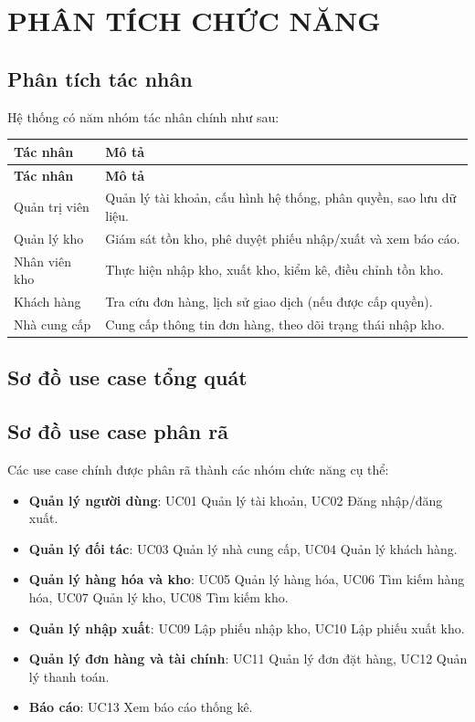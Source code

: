 \chapter{PHÂN TÍCH CHỨC NĂNG}

\section{Phân tích tác nhân}

Hệ thống có năm nhóm tác nhân chính như sau:

\begin{longtable}{|p{3.5cm}|p{9cm}|}
\hline
\textbf{Tác nhân} & \textbf{Mô tả} \\
\hline
\endfirsthead
\hline
\textbf{Tác nhân} & \textbf{Mô tả} \\
\hline
\endhead
Quản trị viên & Quản lý tài khoản, cấu hình hệ thống, phân quyền, sao lưu dữ liệu. \\
\hline
Quản lý kho & Giám sát tồn kho, phê duyệt phiếu nhập/xuất và xem báo cáo. \\
\hline
Nhân viên kho & Thực hiện nhập kho, xuất kho, kiểm kê, điều chỉnh tồn kho. \\
\hline
Khách hàng & Tra cứu đơn hàng, lịch sử giao dịch (nếu được cấp quyền). \\
\hline
Nhà cung cấp & Cung cấp thông tin đơn hàng, theo dõi trạng thái nhập kho. \\
\hline
\end{longtable}

\section{Sơ đồ use case tổng quát}



\section{Sơ đồ use case phân rã}

Các use case chính được phân rã thành các nhóm chức năng cụ thể:

\begin{itemize}[leftmargin=1.5cm]
    \item \textbf{Quản lý người dùng}: UC01 Quản lý tài khoản, UC02 Đăng nhập/đăng xuất.
    \item \textbf{Quản lý đối tác}: UC03 Quản lý nhà cung cấp, UC04 Quản lý khách hàng.
    \item \textbf{Quản lý hàng hóa và kho}: UC05 Quản lý hàng hóa, UC06 Tìm kiếm hàng hóa, UC07 Quản lý kho, UC08 Tìm kiếm kho.
    \item \textbf{Quản lý nhập xuất}: UC09 Lập phiếu nhập kho, UC10 Lập phiếu xuất kho.
    \item \textbf{Quản lý đơn hàng và tài chính}: UC11 Quản lý đơn đặt hàng, UC12 Quản lý thanh toán.
    \item \textbf{Báo cáo}: UC13 Xem báo cáo thống kê.
\end{itemize}

